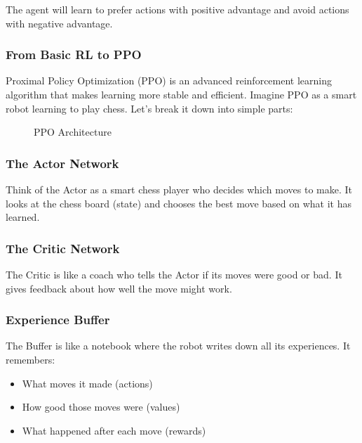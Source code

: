 \documentclass[11pt]{article}
\begin{document}
The agent will learn to prefer actions with positive advantage and avoid actions with negative advantage.

\subsubsection{From Basic RL to PPO}

Proximal Policy Optimization (PPO) is an advanced reinforcement learning algorithm that makes learning more stable and efficient. Imagine PPO as a smart robot learning to play chess. Let's break it down into simple parts:

\begin{figure}[h]
    \centering
    \caption{PPO Architecture}
    \label{fig:ppo_architecture}
\end{figure}

\subsubsection{The Actor Network}
Think of the Actor as a smart chess player who decides which moves to make. It looks at the chess board (state) and chooses the best move based on what it has learned.

\subsubsection{The Critic Network}
The Critic is like a coach who tells the Actor if its moves were good or bad. It gives feedback about how well the move might work.

\subsubsection{Experience Buffer}
The Buffer is like a notebook where the robot writes down all its experiences. It remembers:
\begin{itemize}
    \item What moves it made (actions)
    \item How good those moves were (values)
    \item What happened after each move (rewards)
\end{itemize}
\end{document}
